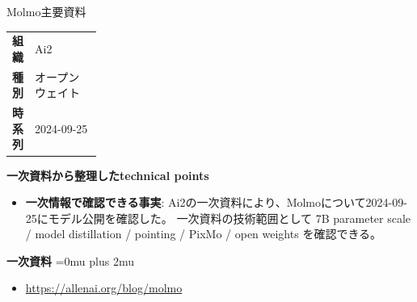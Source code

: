 \begin{technicalnote}{Molmo}{主要資料}
\begingroup
\begin{tabularx}{\linewidth}{@{}>{\bfseries}p{0.22\linewidth}X@{}}
組織 & Ai2 \\
種別 & オープンウェイト \\
時系列 & 2024-09-25 \\
\end{tabularx}
\smallskip
{\bfseries 一次資料から整理したtechnical points}
\begin{itemize}[leftmargin=1.5em,itemsep=0.35em]
\item \textbf{一次情報で確認できる事実}: Ai2の一次資料により、Molmoについて2024-09-25にモデル公開を確認した。 一次資料の技術範囲として 7B parameter scale / model distillation / pointing / PixMo / open weights を確認できる。
\end{itemize}
\begin{minipage}{\linewidth}
\begin{samepage}
{\bfseries 一次資料}
\begingroup\sloppy
\Urlmuskip=0mu plus 2mu\relax
\begin{itemize}[leftmargin=1.5em,itemsep=0.25em]
\item {\scriptsize\url{https://allenai.org/blog/molmo}}
\end{itemize}
\endgroup
\end{samepage}
\end{minipage}
\endgroup
\end{technicalnote}
\medskip

